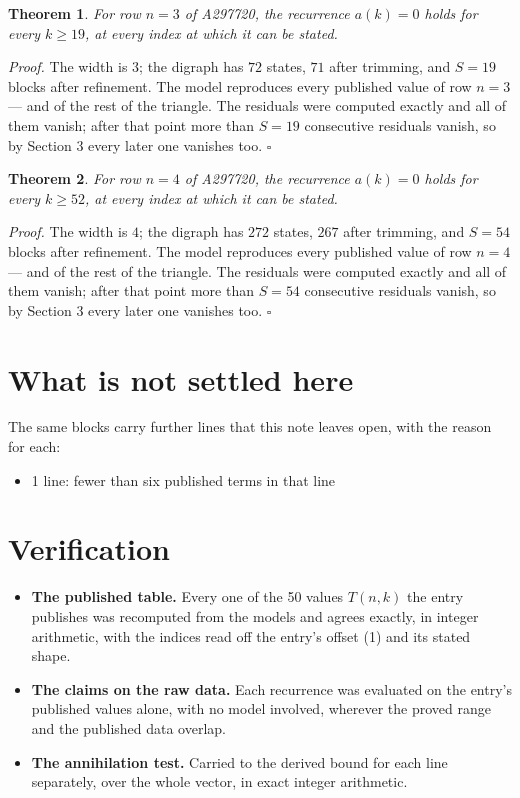 \documentclass[11pt]{article}
\newtheorem{theorem}{Theorem}
\theoremstyle{definition}
\begin{document}
\begin{theorem} For row $n = 3$ of A297720, the recurrence $a(k) = 0$ holds for every $k \ge 19$, at every index at which it can be stated.\end{theorem}

{\itshape Proof.} The width is $3$; the digraph has $72$ states, $71$ after trimming, and $S = 19$ blocks after refinement. The model reproduces every published value of row $n = 3$ --- and of the rest of the triangle. The residuals were computed exactly and all of them vanish; after that point more than $S = 19$ consecutive residuals vanish, so by Section 3 every later one vanishes too. $\square$

\begin{theorem} For row $n = 4$ of A297720, the recurrence $a(k) = 0$ holds for every $k \ge 52$, at every index at which it can be stated.\end{theorem}

{\itshape Proof.} The width is $4$; the digraph has $272$ states, $267$ after trimming, and $S = 54$ blocks after refinement. The model reproduces every published value of row $n = 4$ --- and of the rest of the triangle. The residuals were computed exactly and all of them vanish; after that point more than $S = 54$ consecutive residuals vanish, so by Section 3 every later one vanishes too. $\square$

\section{What is not settled here}

The same blocks carry further lines that this note leaves open, with the reason for each:

\begin{itemize}

\item 1 line: fewer than six published terms in that line

\end{itemize}

\section{Verification}

\begin{itemize}

\item {\bfseries The published table.} Every one of the 50 values $T(n,k)$ the entry publishes was recomputed from the models and agrees exactly, in integer arithmetic, with the indices read off the entry's offset (1) and its stated shape.

\item {\bfseries The claims on the raw data.} Each recurrence was evaluated on the entry's published values alone, with no model involved, wherever the proved range and the published data overlap.

\item {\bfseries The annihilation test.} Carried to the derived bound for each line separately, over the whole vector, in exact integer arithmetic.

\end{itemize}
\end{document}

